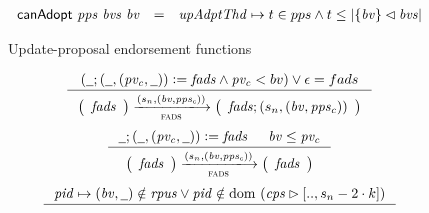 \begin{figure}[htb]
  \begin{equation}
    \label{eq:predicate:canadopt}
    \begin{array}{r c l}
      \mathsf{canAdopt}~\mathit{pps}~\mathit{bvs}~\mathit{bv}
      & =
      & \mathit{upAdptThd} \mapsto t \in pps \wedge
        t \leq \left| \{\mathit{bv}\} \lhd \mathit{bvs} \right|\\
    \end{array}
  \end{equation}
  \caption{Update-proposal endorsement functions}
\end{figure}

\begin{figure}[htb]
  \begin{equation}
    \label{eq:rule:fads-add}
    \inference
    {
      (\wcard ; (\wcard, (\var{pv_c}, \wcard)) \leteq \var{fads}
      \wedge \var{pv_c} < bv) \vee \epsilon = fads
    }
    {
      {
        \left(
          \begin{array}{l}
            \var{fads}
          \end{array}
        \right)
      }
      \trans{fads}{(s_n, (\var{bv}, \var{pps_c}))}
      {
        \left(
          \begin{array}{l}
            \var{fads}; (s_n, (\var{bv}, \var{pps_c}))
          \end{array}
        \right)
      }
    }
  \end{equation}
  \nextdef
  \begin{equation}
    \label{eq:rule:fads-noop}
    \inference
    {
      \wcard ; (\wcard, (\var{pv_c}, \wcard)) \leteq \var{fads} & \var{bv} \leq \var{pv_c}
    }
    {
      {
        \left(
          \begin{array}{l}
            \var{fads}
          \end{array}
        \right)
      }
      \trans{fads}{(s_n, (\var{bv}, \var{pps_c}))}
      {
        \left(
          \begin{array}{l}
            \var{fads}
          \end{array}
        \right)
      }
    }
  \end{equation}
  \nextdef
    \begin{equation}
    \label{eq:rule:up-up-invalid}
    \inference
    {
      \var{pid} \mapsto (\var{bv}, \wcard) \notin \var{rpus}
      \vee \var{pid} \notin \dom~(\var{cps} \restrictrange [.., s_n - 2 \cdot k])
    }
    {
      {
        \begin{array}{l}

\end{array}}}
\end{equation}
\end{figure}

